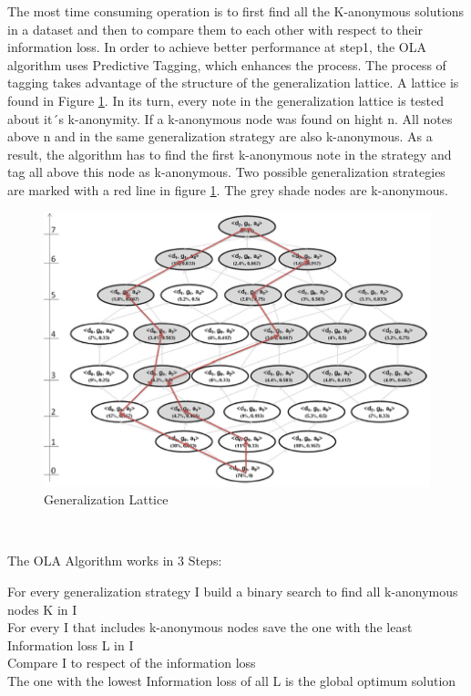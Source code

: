 \documentclass{llncs}
\begin{document}
The most time consuming operation is to first find all the K-anonymous solutions in a dataset and then to compare them to each other with respect to their information loss. In order to achieve better performance at step1, the OLA algorithm uses Predictive Tagging, which enhances the process. The process of tagging takes advantage of the structure of the generalization lattice. A lattice is found in Figure \ref{lattice}. In its turn, every note in the generalization lattice is tested about it´s k-anonymity. If a k-anonymous node was found on hight n. All notes above n and in the same generalization strategy are also k-anonymous. As a result, the algorithm has to find the first k-anonymous note in the strategy and tag all above this node as k-anonymous. Two possible generalization strategies are marked with a red line in figure \ref{lattice}. The grey shade nodes are k-anonymous.\\
\begin{figure}
	\centering
	\includegraphics[width=1.0\textwidth]{lattice.png}
	\caption{Generalization Lattice\cite{el2009globally}}%
	\label{lattice}
\end{figure}
\\
\begin{algorithm}[H]
\caption{The OLA Algorithm works in 3 Steps:}
{
For every generalization strategy I build a binary search to find all k-anonymous nodes K in I\\
For every I that includes k-anonymous nodes save the one with the least Information loss L in I\\
Compare I to respect of the information loss\\
The one with the lowest Information loss of all L is the global optimum solution\\
}
\end{algorithm}
\end{document}
